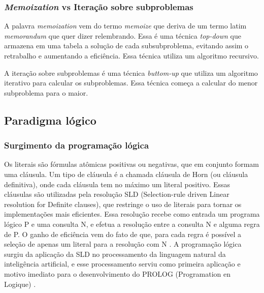 \subsubsection{\textit{Memoization} vs Iteração sobre subproblemas} 
A palavra \textit{memoization} vem do termo \textit{memoize} que deriva de um termo latim \textit{memorandum} que quer dizer relembrando. Essa é uma técnica \textit{top-down} que  armazena em uma tabela a solução de cada subsubproblema, evitando assim o retrabalho e aumentando a eficiência. Essa técnica utiliza um algoritmo recursivo.

A iteração sobre subproblemas é uma técnica \textit{buttom-up} que utiliza um algoritmo iterativo para calcular os subproblemas. Essa técnica começa a calcular do menor subproblema para o maior. 

\subsection{Paradigma lógico}
\subsubsection{Surgimento da programação lógica}
Os literais são fórmulas atômicas positivas ou negativas, que em conjunto formam uma cláusula. Um tipo de cláusula é a chamada cláusula de Horn (ou cláusula definitiva), onde cada cláusula tem no máximo um literal positivo. Essas cláusulas são utilizadas pela resolução SLD (Selection-rule driven Linear resolution for Definite clauses), que restringe o uso de literais para tornar os implementações mais eficientes. Essa resolução recebe como entrada um programa lógico P e uma consulta N, e efetua a resolução entre a consulta N e alguma regra de P. O ganho de eficiência vem do fato de que, para cada regra é possível a seleção de apenas um literal para a resolução com N \cite{rodrigues2010fundamentos}.
A programação lógica surgiu da aplicação da SLD no processamento da linguagem natural da  inteligência artificial, e esse processamento serviu como primeira aplicação e motivo imediato para o desenvolvimento do PROLOG (Programation en Logique) \cite{rodrigues2010fundamentos}.
